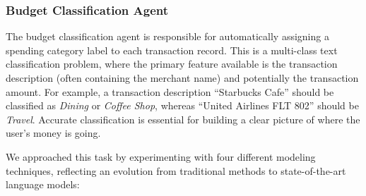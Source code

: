 \documentclass{scrartcl}
\begin{document}
\subsubsection{Budget Classification Agent}
The budget classification agent is responsible for automatically assigning a spending category label to each transaction record. This is a multi-class text classification problem, where the primary feature available is the transaction description (often containing the merchant name) and potentially the transaction amount. For example, a transaction description “Starbucks Cafe” should be classified as \textit{Dining} or \textit{Coffee Shop}, whereas “United Airlines FLT 802” should be \textit{Travel}. Accurate classification is essential for building a clear picture of where the user’s money is going.

We approached this task by experimenting with four different modeling techniques, reflecting an evolution from traditional methods to state-of-the-art language models:
\end{document}
